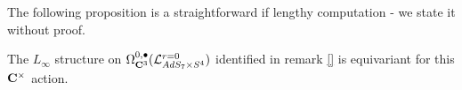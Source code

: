 \documentclass[../main.tex]{subfiles}
\begin{document}
The following proposition is a straightforward if lengthy computation - we state it without proof.
\begin{prop}\label{prop:ads7decomp}
The $L_\infty$ structure on $\Omega^{0,\bullet}_{\mathbf{C}^3} (\mathcal{L}^{{r=0}}_{AdS_7\times S^4} )$ identified in remark \ref{} is equivariant for this $\mathbf{C}^\times$ action. 
\end{prop}

%
\end{document}
